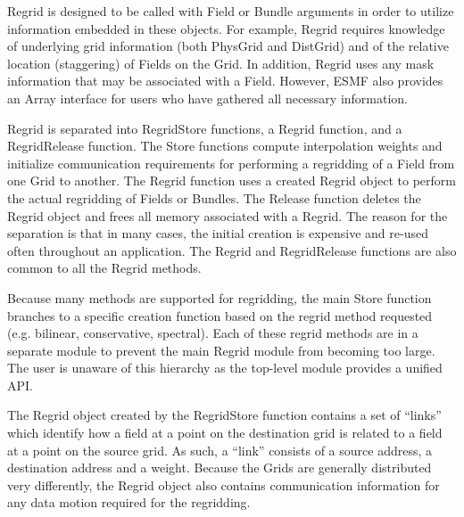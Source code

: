 

Regrid is designed to be called with Field or Bundle
arguments in order to utilize information embedded in
these objects.  For example, Regrid requires knowledge
of underlying grid information (both PhysGrid and DistGrid)
and of the relative location (staggering) of Fields on
the Grid.  In addition, Regrid uses any mask information
that may be associated with a Field.  However, ESMF also
provides an Array interface for users who have gathered all
necessary information.

Regrid is separated into RegridStore functions, a Regrid
function, and a RegridRelease function. The Store functions
compute interpolation weights and initialize communication
requirements for performing a regridding of a Field
from one Grid to another.  The Regrid function uses
a created Regrid object to perform the actual regridding
of Fields or Bundles.  The Release function deletes the
Regrid object and frees all memory associated with a Regrid.
The reason for the separation is that in many cases, the
initial creation is expensive and re-used often throughout
an application.  The Regrid and RegridRelease functions are
also common to all the Regrid methods.

Because many methods are supported for regridding,
the main Store function branches to a specific
creation function based on the regrid method requested
(e.g. bilinear, conservative, spectral).  Each of
these regrid methods are in a separate module to
prevent the main Regrid module from becoming too
large.  The user is unaware of this hierarchy as the
top-level module provides a unified API.

The Regrid object created by the RegridStore function
contains a set of ``links''
which identify how a field at a point on the
destination grid is related to a field at a
point on the source grid.  As such, a ``link''
consists of a source address, a destination address
and a weight.  Because the Grids are generally
distributed very differently, the Regrid object
also contains communication information
for any data motion required for the regridding.

